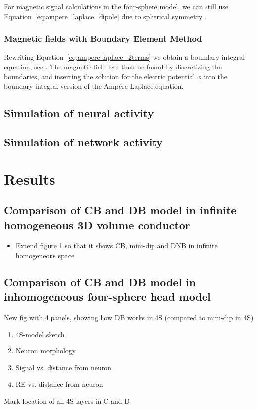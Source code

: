\documentclass[preprint,10pt,authoryear]{elsarticle}
\newcommand{\sntxt}[1]{{\color{NavyBlue}#1}}
\begin{document}
For magnetic signal calculations in the four-sphere model, we can still use Equation~\eqref{eq:ampere_laplace_dipole} due to spherical symmetry \citep{HAMALAINEN1993,NUNEZ2006}.

\subsubsection{Magnetic fields with Boundary Element Method}
Rewriting Equation~\eqref{eq:ampere-laplace_2terms} we obtain a boundary integral equation, see \cite{GESELOWITZ1970,HAMALAINEN1993}. The magnetic field can then be found by discretizing the boundaries, and inserting the solution for the electric potential $\phi$ into the boundary integral version of the Ampère-Laplace equation.

\subsection{Simulation of neural activity}

\subsection{Simulation of network activity}

\section{Results}\label{sec:results}

\subsection{Comparison of CB and DB model in infinite homogeneous 3D volume conductor}\label{subsec:cb_db_comp_inf}
\sntxt{
\begin{itemize}	
	\item Extend figure 1 so that it shows CB, mini-dip and DNB in infinite homogeneous space
\end{itemize}
}
\subsection{Comparison of CB and DB model in inhomogeneous four-sphere head model}\label{subsec:cb_db_comp_4s}
\sntxt{
New fig with 4 panels, showing how DB works in 4S (compared to mini-dip in 4S)
\begin{enumerate}[A:]
\item 4S-model sketch
\item Neuron morphology
\item Signal vs. distance from neuron
\item RE vs. distance from neuron
\end{enumerate}
Mark location of all 4S-layers in C and D
}
\end{document}
